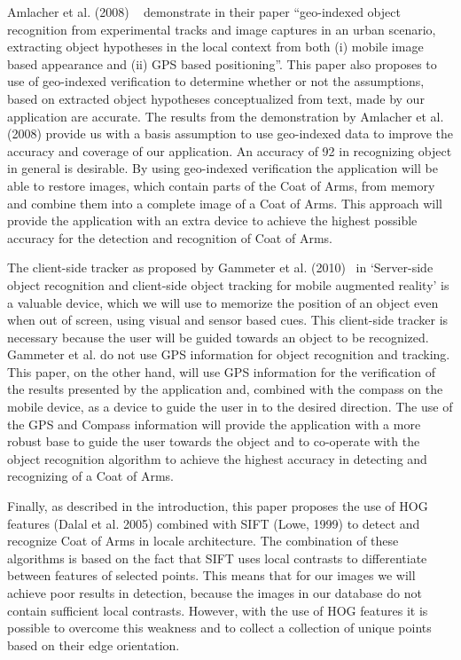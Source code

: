 \documentclass[12pt ]{article}
\begin{document}
Amlacher et al. (2008) ~\cite{Amlacher:2008:GOR:1409240.1409291} demonstrate in their paper “geo-indexed object recognition
from experimental tracks and image captures in an urban scenario, extracting object
hypotheses in the local context from both (i) mobile image based appearance and (ii) GPS
based positioning”. This paper also proposes to use of geo-indexed verification to determine
whether or not the assumptions, based on extracted object hypotheses conceptualized from
text, made by our application are accurate. The results from the demonstration by Amlacher et
al. (2008) provide us with a basis assumption to use geo-indexed data to improve the accuracy
and coverage of our application. An accuracy of 92%
in recognizing object in general is desirable. By using geo-indexed verification the application
will be able to restore images, which contain parts of the Coat of Arms, from memory and
combine them into a complete image of a Coat of Arms. This approach will provide the
application with an extra device to achieve the highest possible accuracy for the detection and
recognition of Coat of Arms.

The client-side tracker as proposed by Gammeter et al. (2010)~\cite{eth_biwi_00782} in ‘Server-side object
recognition and client-side object tracking for mobile augmented reality’ is a valuable device,
which we will use to memorize the position of an object even when out of screen, using visual
and sensor based cues. This client-side tracker is necessary because the user will be guided
towards an object to be recognized. Gammeter et al. do not use GPS information for object
recognition and tracking. This paper, on the other hand, will use GPS information for the
verification of the results presented by the application and, combined with the compass on the
mobile device, as a device to guide the user in to the desired direction. The use of the GPS
and Compass information will provide the application with a more robust base to guide the
user towards the object and to co-operate with the object recognition algorithm to achieve the
highest accuracy in detecting and recognizing of a Coat of Arms.

Finally, as described in the introduction, this paper proposes the use of HOG features
(Dalal et al. 2005) combined with SIFT (Lowe, 1999) to detect and recognize Coat of Arms in
locale architecture. The combination of these algorithms is based on the fact that SIFT uses
local contrasts to differentiate between features of selected points. This means that for our
images we will achieve poor results in detection, because the images in our database do not
contain sufficient local contrasts. However, with the use of HOG features it is possible to
overcome this weakness and to collect a collection of unique points based on their edge
orientation.
\end{document}
